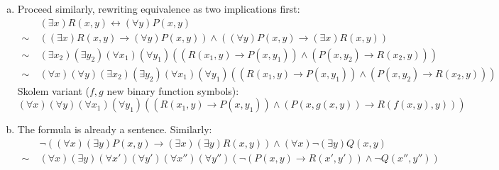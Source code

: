 \begin{problem}
\begin{solution}
\begin{enumerate}[(a)]
            \item Proceed similarly, rewriting equivalence as two implications first:
            \begin{align*}
                &(\exists x)R(x,y)\leftrightarrow (\forall y)P(x,y)\\
                \sim\ &((\exists x)R(x,y)\to (\forall y)P(x,y))\land((\forall y)P(x,y)\to (\exists x)R(x,y))\\
                \sim\ &(\exists x_2)(\exists y_2)(\forall x_1)(\forall y_1)((R(x_1,y)\to P(x,y_1))\land(P(x,y_2)\to R(x_2,y)))\\
                \sim\ &(\forall x)(\forall y)(\exists x_2)(\exists y_2)(\forall x_1)(\forall y_1)((R(x_1,y)\to P(x,y_1))\land(P(x,y_2)\to R(x_2,y)))
            \end{align*}
            Skolem variant ($f,g$ new binary function symbols):
            $$
            (\forall x)(\forall y)(\forall x_1)(\forall y_1)((R(x_1,y)\to P(x,y_1))\land(P(x,g(x,y))\to R(f(x,y),y)))
            $$

            \item The formula is already a sentence. Similarly:
            \begin{align*}
            &\neg((\forall x)(\exists y)P(x,y)\to (\exists x)(\exists y)R(x,y))\wedge(\forall x)\neg(\exists y)Q(x,y)\\
            \sim\ & (\forall x)(\exists y)(\forall x')(\forall y')(\forall x'')(\forall y'')
            (    
                \neg(P(x,y)\to R(x',y'))\wedge\neg Q(x'',y'') 
            )
            \end{align*}
            
        \end{enumerate}
                    
    \end{solution}

\end{problem}


